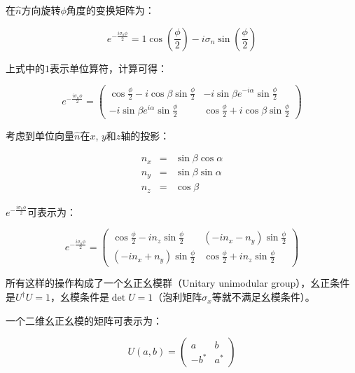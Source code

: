在$\hat n$方向旋转$\phi$角度的变换矩阵为：

\begin{equation}
e^{- \frac{ i \sigma_n \phi}{2}} = 1 \cos \left( \frac{\phi}{2} \right) - i \sigma_n \sin \left( \frac{\phi}{2}  \right) 
\end{equation}

上式中的$1$表示单位算符，计算可得：

\begin{equation}
e^{- \frac{ i \sigma_n \phi}{2}} = \left( \begin{array}{cc}   \cos \frac{\phi}{2} - i \cos \beta \sin \frac{\phi}{2} & - i \sin \beta e^{- i \alpha} \sin \frac{\phi}{2} \\  - i \sin \beta e^{i \alpha} \sin \frac{\phi}{2} & \cos \frac{\phi}{2} + i \cos \beta \sin \frac{\phi}{2}   \end{array}  \right)
\end{equation}

考虑到单位向量$\hat n$在$x$, $y$和$z$轴的投影：

\begin{eqnarray}
n_x & = & \sin \beta \cos \alpha \\
n_y & = & \sin \beta \sin \alpha \\
n_z & = & \cos \beta
\end{eqnarray}

$e^{- \frac{ i \sigma_n \phi}{2}}$可表示为：

\begin{equation}
e^{- \frac{ i \sigma_n \phi}{2}} = \left( \begin{array}{cc}   \cos \frac{\phi}{2} - i n_z \sin \frac{\phi}{2} & \left( - i n_x - n_y  \right) \sin \frac{\phi}{2} \\  \left( - i n_x + n_y  \right) \sin \frac{\phi}{2} & \cos \frac{\phi}{2} + i n_z \sin \frac{\phi}{2}   \end{array}  \right)
\end{equation}

所有这样的操作构成了一个幺正幺模群（Unitary unimodular group），幺正条件是$U^\dagger U = 1$，幺模条件是$\det U = 1$（泡利矩阵$\sigma_x$等就不满足幺模条件）。

一个二维幺正幺模的矩阵可表示为：

\begin{equation}
U(a,b)=\left( \begin{array}{cc}  a & b \\ - b^* & a^*  \end{array} \right)
\end{equation}

